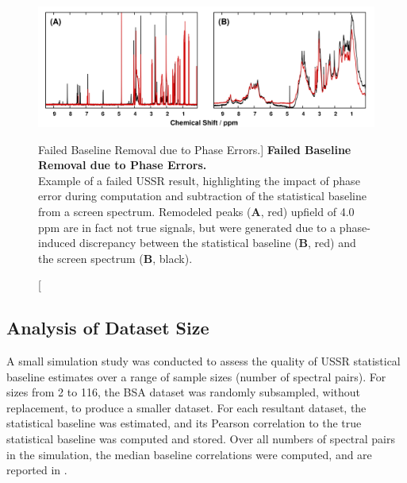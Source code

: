 \begin{figure}[ht!]
\includegraphics[width=6.5in]{figs/ussr/03-ussrfail.png}
\caption
      [Failed Baseline Removal due to Phase Errors.]{
  {\bf Failed Baseline Removal due to Phase Errors.}
  \\
  Example of a failed USSR result, highlighting the impact of phase error
  during computation and subtraction of the statistical baseline from a screen
  spectrum. Remodeled peaks ({\bf A}, red) upfield of 4.0 ppm are in fact not
  true signals, but were generated due to a phase-induced discrepancy between
  the statistical baseline ({\bf B}, red) and the screen spectrum
  ({\bf B}, black).
}
\label{figure.7.3}
\end{figure}

\subsection{Analysis of Dataset Size}

\begin{doublespace}
A small simulation study was conducted to assess the quality of USSR
statistical baseline estimates over a range of sample sizes (number of spectral
pairs). For sizes from 2 to 116, the BSA dataset was randomly subsampled,
without replacement, to produce a smaller dataset. For each resultant dataset,
the statistical baseline was estimated, and its Pearson correlation to the true
statistical baseline was computed and stored. Over all numbers of spectral
pairs in the simulation, the median baseline correlations were computed, and
are reported in .
\end{doublespace}

